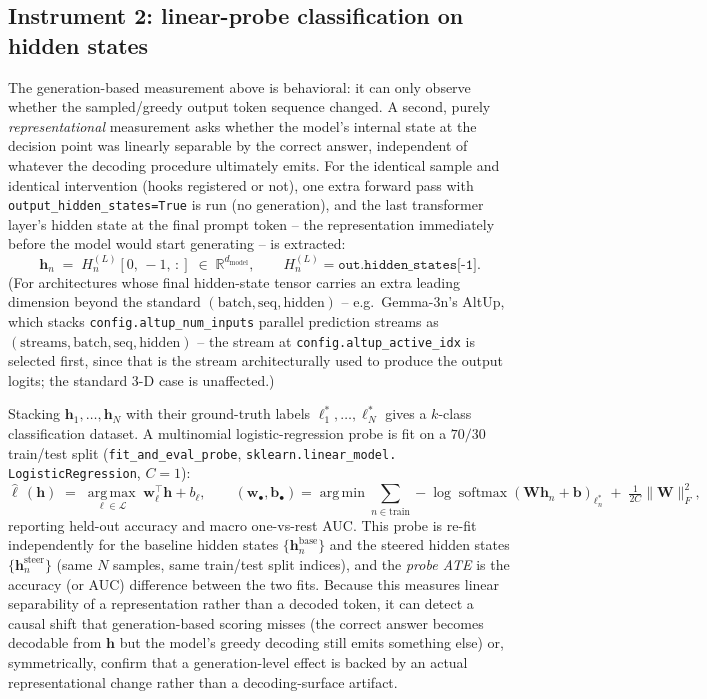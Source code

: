 \subsection{Instrument 2: linear-probe classification on hidden states}

The generation-based measurement above is behavioral: it can only observe
whether the sampled/greedy output token sequence changed. A second,
purely \emph{representational} measurement asks whether the model's internal
state at the decision point was linearly separable by the correct answer,
independent of whatever the decoding procedure ultimately emits. For the
identical sample and identical intervention (hooks registered or not), one
extra forward pass with \texttt{output\_hidden\_states=True} is run (no
generation), and the last transformer layer's hidden state at the final
prompt token -- the representation immediately before the model would
start generating -- is extracted:
\[
  \mathbf{h}_n \;=\; H^{(L)}_n[0,\,-1,\,:] \;\in\; \mathbb{R}^{d_{\text{model}}},
  \qquad H^{(L)}_n = \texttt{out.hidden\_states[-1]}.
\]
(For architectures whose final hidden-state tensor carries an extra
leading dimension beyond the standard $(\text{batch}, \text{seq},
\text{hidden})$ -- e.g.\ Gemma-3n's AltUp, which stacks
\texttt{config.altup\_num\_inputs} parallel prediction streams as
$(\text{streams}, \text{batch}, \text{seq}, \text{hidden})$ -- the stream at
\texttt{config.altup\_active\_idx} is selected first, since that is the
stream architecturally used to produce the output logits; the standard
3-D case is unaffected.)

Stacking $\mathbf{h}_1,\dots,\mathbf{h}_N$ with their ground-truth labels
$\ell^{*}_1,\dots,\ell^{*}_N$ gives a $k$-class classification dataset. A
multinomial logistic-regression probe is fit on a $70/30$ train/test split
(\texttt{fit\_and\_eval\_probe}, \texttt{sklearn.linear\_model.
LogisticRegression}, $C{=}1$):
\[
  \hat{\ell}\,(\mathbf{h}) \;=\; \operatorname*{arg\,max}_{\ell \in \mathcal{L}}
  \; \mathbf{w}_\ell^{\top}\mathbf{h} + b_\ell,
  \qquad
  (\mathbf{w}_{\bullet}, \mathbf{b}_{\bullet}) = \operatorname*{arg\,min}
  \sum_{n \in \text{train}} -\log \operatorname{softmax}(\mathbf{W}\mathbf{h}_n+\mathbf{b})_{\ell^{*}_n}
  \;+\; \tfrac{1}{2C}\lVert \mathbf{W}\rVert_F^2 ,
\]
reporting held-out accuracy and macro one-vs-rest AUC. This probe is
re-fit independently for the baseline hidden states $\{\mathbf{h}^{\text{base}}_n\}$
and the steered hidden states $\{\mathbf{h}^{\text{steer}}_n\}$ (same $N$
samples, same train/test split indices), and the \emph{probe ATE} is the
accuracy (or AUC) difference between the two fits. Because this measures
linear separability of a representation rather than a decoded token, it can
detect a causal shift that generation-based scoring misses (the correct
answer becomes decodable from $\mathbf{h}$ but the model's greedy decoding
still emits something else) or, symmetrically, confirm that a generation-level
effect is backed by an actual representational change rather than a
decoding-surface artifact.

